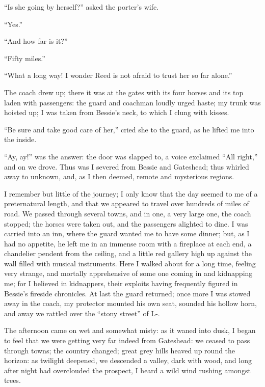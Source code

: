 \enquote{Is she going by herself?} asked the porter's wife.

\enquote{Yes.}

\enquote{And how far is it?}

\enquote{Fifty miles.}

\enquote{What a long way! I wonder \Mrs{} Reed is not afraid to trust her
so far alone.}

The coach drew up; there it was at the gates with its four horses and
its top laden with passengers: the guard and coachman loudly urged
haste; my trunk was hoisted up; I was taken from Bessie's neck, to which
I clung with kisses.

\enquote{Be sure and take good care of her,} cried she to the guard, as
he lifted me into the inside.

\enquote{Ay, ay!} was the answer: the door was slapped to, a voice
exclaimed \enquote{All right,} and on we drove. Thus was I severed from
Bessie and Gateshead; thus whirled away to unknown, and, as I then
deemed, remote and mysterious regions.

I remember but little of the journey; I only know that the day seemed to
me of a preternatural length, and that we appeared to travel over
hundreds of miles of road. We passed through several towns, and in one,
a very large one, the coach stopped; the horses were taken out, and the
passengers alighted to dine. I was carried into an inn, where the guard
wanted me to have some dinner; but, as I had no appetite, he left me in
an immense room with a fireplace at each end, a chandelier pendent from
the ceiling, and a little red gallery high up against the wall filled
with musical instruments. Here I walked about for a long time, feeling
very strange, and mortally apprehensive of some one coming in and
kidnapping me; for I believed in kidnappers, their exploits having
frequently figured in Bessie's fireside chronicles. At last the guard
returned; once more I was stowed away in the coach, my protector mounted
his own seat, sounded his hollow horn, and away we rattled over the
\enquote{stony street} of L-.

The afternoon came on wet and somewhat misty: as it waned into dusk, I
began to feel that we were getting very far indeed from Gateshead: we
ceased to pass through towns; the country changed; great grey hills
heaved up round the horizon: as twilight deepened, we descended a
valley, dark with wood, and long after night had overclouded the
prospect, I heard a wild wind rushing amongst trees.


